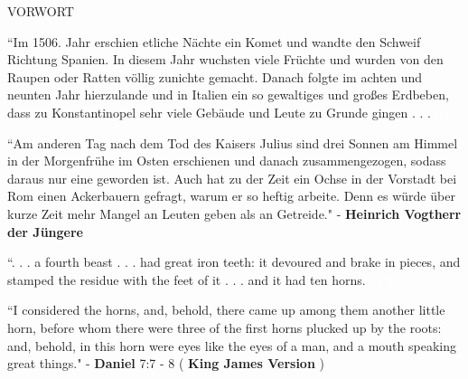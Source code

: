 \documentclass[11pt]{article}
\begin{document}
\begingroup
\begin{center}
\huge VORWORT
\end{center}
\endgroup

\vspace*{0.1\baselineskip}

\begingroup
\begin{center}
``Im 1506. Jahr erschien etliche Nächte ein Komet und wandte den Schweif Richtung Spanien. In diesem Jahr wuchsten viele Früchte und wurden von den Raupen oder Ratten völlig zunichte gemacht. Danach folgte im achten und neunten Jahr hierzulande und in Italien ein so gewaltiges und großes Erdbeben, dass zu Konstantinopel sehr viele Gebäude und Leute zu Grunde gingen . . . 
\rightskip\leftskip
\phantom{text} \hfill \textcolor{white}{fuck}
\end{center}
\endgroup

\begingroup
\begin{center}
``Am anderen Tag nach dem Tod des Kaisers Julius sind drei Sonnen am Himmel in der Morgenfrühe im Osten erschienen und danach zusammengezogen, sodass daraus nur eine geworden ist. Auch hat zu der Zeit ein Ochse in der Vorstadt bei Rom einen Ackerbauern gefragt, warum er so heftig arbeite. Denn es würde über kurze Zeit mehr Mangel an Leuten geben als an Getreide."
\rightskip\leftskip
\phantom{text} \hfill - \textbf{Heinrich Vogtherr der Jüngere}
\end{center}
\endgroup

\vspace*{0.1\baselineskip}

\begingroup
\begin{center}
``. . . a fourth beast . . . had great iron teeth: it devoured and brake in pieces, and stamped the residue with the feet of it . . . and it had ten horns.
\rightskip\leftskip
\phantom{text} \hfill \textcolor{white}{fuck}
\end{center}
\endgroup

\begingroup
\begin{center}
``I considered the horns, and, behold, there came up among them another little horn, before whom there were three of the first horns plucked up by the roots: and, behold, in this horn were eyes like the eyes of a man, and a mouth speaking great things."
\rightskip\leftskip
\phantom{text} \hfill - \textbf{Daniel} 7:7 - 8 ( \textbf{King James Version} )
\end{center}
\endgroup
\end{document}
